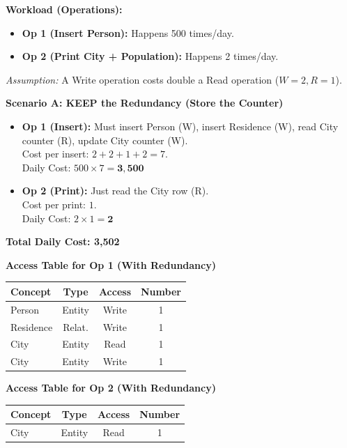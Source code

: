 \textbf{Workload (Operations):}
\begin{itemize}
    \item \textbf{Op 1 (Insert Person):} Happens 500 times/day.
    \item \textbf{Op 2 (Print City + Population):} Happens 2 times/day.
\end{itemize}

\textit{Assumption:} A Write operation costs double a Read operation ($W=2, R=1$).

\vspace{0.3cm}
\textbf{Scenario A: KEEP the Redundancy (Store the Counter)}
\begin{itemize}
    \item \textbf{Op 1 (Insert):} Must insert Person (W), insert Residence (W), read City counter (R), update City counter (W). \\
    Cost per insert: $2 + 2 + 1 + 2 = 7$. \\
    Daily Cost: $500 \times 7 = \mathbf{3,500}$
    
    \item \textbf{Op 2 (Print):} Just read the City row (R). \\
    Cost per print: $1$. \\
    Daily Cost: $2 \times 1 = \mathbf{2}$
\end{itemize}
\textbf{Total Daily Cost: 3,502}

\vspace{0.2cm}
\begin{center}
\textbf{Access Table for Op 1 (With Redundancy)}

\begin{tabular}{|l|c|c|c|}
\hline
\textbf{Concept} & \textbf{Type} & \textbf{Access} & \textbf{Number} \\
\hline
Person & Entity & Write & 1 \\
Residence & Relat. & Write & 1 \\
City & Entity & Read & 1 \\
City & Entity & Write & 1 \\
\hline
\end{tabular}

\vspace{0.2cm}
\textbf{Access Table for Op 2 (With Redundancy)}

\begin{tabular}{|l|c|c|c|}
\hline
\textbf{Concept} & \textbf{Type} & \textbf{Access} & \textbf{Number} \\
\hline
City & Entity & Read & 1 \\
\hline
\end{tabular}
\end{center}

